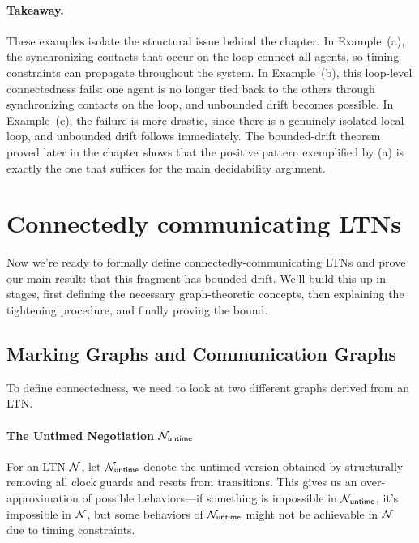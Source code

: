 \begin{example}
\paragraph{Takeaway.}
These examples isolate the structural issue behind the chapter. In
Example~(a), the synchronizing contacts that occur on the loop connect all
agents, so timing constraints can propagate throughout the system. In
Example~(b), this loop-level connectedness fails: one agent is no longer tied
back to the others through synchronizing contacts on the loop, and unbounded
drift becomes possible. In Example~(c), the failure is more drastic, since there
is a genuinely isolated local loop, and unbounded drift follows immediately. The
bounded-drift theorem proved later in the chapter shows that the positive pattern
exemplified by (a) is exactly the one that suffices for the main decidability
argument.
\end{example}


\section{Connectedly communicating LTNs}
\label{sec:connected}

Now we're ready to formally define connectedly-communicating LTNs and prove our main result: that this fragment has bounded drift. We'll build this up in stages, first defining the necessary graph-theoretic concepts, then explaining the tightening procedure, and finally proving the bound.

\subsection{Marking Graphs and Communication Graphs}

To define connectedness, we need to look at two different graphs derived from an LTN.

\paragraph*{The Untimed Negotiation $\mathcal{N}_{\mathsf{untime}}$}

For an LTN $\mathcal{N}$, let $\mathcal{N}_{\mathsf{untime}}$ denote the untimed version obtained by structurally removing all clock guards and resets from transitions. This gives us an over-approximation of possible behaviors---if something is impossible in $\mathcal{N}_{\mathsf{untime}}$, it's impossible in $\mathcal{N}$, but some behaviors of $\mathcal{N}_{\mathsf{untime}}$ might not be achievable in $\mathcal{N}$ due to timing constraints.

